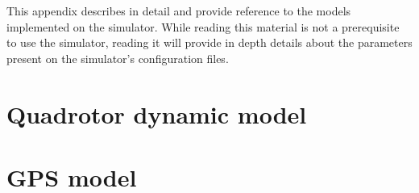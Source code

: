 \documentclass[a4paper,11pt]{report}
\begin{document}
This appendix describes in detail and provide reference to the models implemented on the simulator.
While reading this material is not a prerequisite to use the simulator, reading it will provide in depth details about the parameters present on the simulator's configuration files.

\section{Quadrotor dynamic model}


\section{GPS model}
\end{document}
